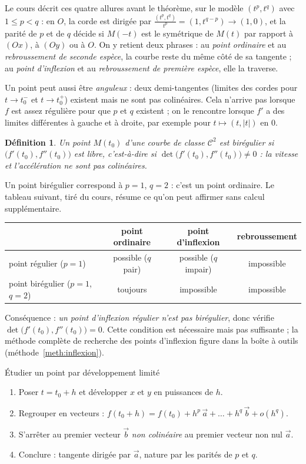 \documentclass[a4paper,11pt]{article}
\numberwithin{equation}{section}
\numberwithin{figure}{section}
\numberwithin{table}{section}
\theoremstyle{enonce}
\newtheorem{definition}{Définition}[section]
\theoremstyle{exemple}
\theoremstyle{remarque}
\newcommand{\ve}[1]{\vec{#1}}
\begin{document}
\begin{votrecours}
Le cours décrit ces quatre allures avant le théorème, sur le modèle $(t^p,t^q)$ avec $1\leq p<q$ : en $O$, la corde est
dirigée par $\frac{(t^p,t^q)}{t^p}=(1,t^{q-p})\to(1,0)$, et la parité de $p$ et de $q$ décide si $M(-t)$ est le
symétrique de $M(t)$ par rapport à $(Ox)$, à $(Oy)$ ou à $O$. On y retient deux phrases : au \emph{point ordinaire} et au
\emph{rebroussement de seconde espèce}, la courbe reste du même côté de sa tangente ; au \emph{point d'inflexion} et au
\emph{rebroussement de première espèce}, elle la traverse.

Un point peut aussi être \emph{anguleux} : deux demi-tangentes (limites des cordes pour $t\to t_0^-$ et $t\to t_0^+$)
existent mais ne sont pas colinéaires. Cela n'arrive pas lorsque $f$ est assez régulière pour que $p$ et $q$ existent ;
on le rencontre lorsque $f'$ a des limites différentes à gauche et à droite, par exemple pour $t\mapsto(t,|t|)$ en $0$.
\end{votrecours}

\begin{definition}
Un point $M(t_0)$ d'une courbe de classe $\mathcal C^2$ est \emph{birégulier} si $\big(f'(t_0),f''(t_0)\big)$ est libre,
c'est-à-dire si $\det\big(f'(t_0),f''(t_0)\big)\neq0$ : la vitesse et l'accélération ne sont pas colinéaires.
\end{definition}

Un point birégulier correspond à $p=1$, $q=2$ : c'est un point ordinaire. Le tableau suivant, tiré du cours, résume ce
qu'on peut affirmer sans calcul supplémentaire.
\begin{center}
\renewcommand{\arraystretch}{1.25}\small
\begin{tabular}{l|ccc}
 & point ordinaire & point d'inflexion & rebroussement\\\hline
point régulier ($p=1$) & possible ($q$ pair) & possible ($q$ impair) & impossible\\
point birégulier ($p=1$, $q=2$) & toujours & impossible & impossible
\end{tabular}
\end{center}
Conséquence : \emph{un point d'inflexion régulier n'est pas birégulier}, donc vérifie $\det\big(f'(t_0),f''(t_0)\big)=0$.
Cette condition est nécessaire mais pas suffisante ; la méthode complète de recherche des points d'inflexion figure dans
la boîte à outils (méthode~\ref{meth:inflexion}).

\begin{methode}{Étudier un point par développement limité}\label{meth:dl}
\begin{enumerate}
\item Poser $t=t_0+h$ et développer $x$ et $y$ en puissances de $h$.
\item Regrouper en vecteurs : $f(t_0+h)=f(t_0)+h^p\,\ve a+\dots+h^q\,\ve b+o(h^q)$.
\item S'arrêter au premier vecteur $\ve b$ \emph{non colinéaire} au premier vecteur non nul $\ve a$.
\item Conclure : tangente dirigée par $\ve a$, nature par les parités de $p$ et $q$.
\end{enumerate}
\end{methode}
\end{document}
